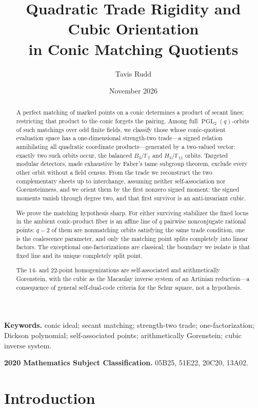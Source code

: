 \documentclass[11pt]{article}
\title{Quadratic Trade Rigidity and Cubic Orientation\\
in Conic Matching Quotients}
\author{Tavis Rudd}
\date{November 2026}
\theoremstyle{definition}
\theoremstyle{remark}
\newcommand{\F}{\mathbb{F}}
\begin{document}
\maketitle

\begin{abstract}
A perfect matching of marked points on a conic determines a product of secant
lines; restricting that product to the conic forgets the pairing.  Among full
\(\operatorname{PGL}_2(q)\)-orbits of such matchings over odd finite fields,
we classify those whose conic-quotient evaluation space has a one-dimensional
strength-two trade---a signed relation annihilating all quadratic coordinate
products---generated by a two-valued vector: exactly two such orbits occur, the balanced
\(B_3/\F_7\) and \(H_3/\F_{11}\) orbits.  Targeted modular detectors, made
exhaustive by Faber's tame subgroup theorem, exclude every other orbit without
a field census.  From the trade we reconstruct the two complementary sheets up
to interchange, assuming neither self-association nor Gorensteinness, and we
orient them by the first nonzero signed moment: the signed moments vanish
through degree two, and that first survivor is an anti-invariant cubic.

We prove the matching hypothesis sharp.  For either surviving stabilizer the
fixed locus in the ambient conic-product fiber is an affine line of \(q\)
pairwise nonconjugate rational points: \(q-2\) of them are nonmatching orbits
satisfying the same trade condition, one is the coalescence parameter, and
only the matching point splits completely into linear factors.  The exceptional
one-factorizations are classical; the boundary we isolate is that fixed line
and its unique completely split point.

The \(14\)- and \(22\)-point homogenizations are self-associated and
arithmetically Gorenstein, with the cubic as the Macaulay inverse system of an
Artinian reduction---a consequence of general self-dual-code criteria for the
Schur square, not a hypothesis.
\end{abstract}

\noindent\textbf{Keywords.} conic ideal; secant matching; strength-two
trade; one-factorization; Dickson polynomial; self-associated points;
arithmetically Gorenstein; cubic inverse system.

\smallskip
\noindent\textbf{2020 Mathematics Subject Classification.} 05B25, 51E22,
20C20, 13A02.

\section{Introduction}
\end{document}
